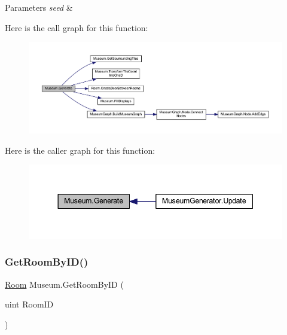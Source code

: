 \begin{DoxyParams}{Parameters}
{\em seed} & \\
\hline
\end{DoxyParams}
Here is the call graph for this function\+:
\nopagebreak
\begin{figure}[H]
\begin{center}
\leavevmode
\includegraphics[width=350pt]{class_museum_a2a301b4e27f35da164ffa03b3d3d7e81_cgraph}
\end{center}
\end{figure}
Here is the caller graph for this function\+:
\nopagebreak
\begin{figure}[H]
\begin{center}
\leavevmode
\includegraphics[width=344pt]{class_museum_a2a301b4e27f35da164ffa03b3d3d7e81_icgraph}
\end{center}
\end{figure}
\mbox{\label{class_museum_a31c3e63a3a1e2edf6e219cb1f04b9515}} 
\subsubsection{\texorpdfstring{Get\+Room\+By\+I\+D()}{GetRoomByID()}}
{\footnotesize\ttfamily \mbox{\hyperlink{class_room}{Room}} Museum.\+Get\+Room\+By\+ID (\begin{DoxyParamCaption}\item[{uint}]{Room\+ID }\end{DoxyParamCaption})}



